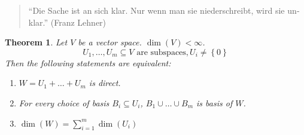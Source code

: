 \documentclass[a4paper,landscape,twocolumn]{article}
\newcommand\set[1]{\left\{#1\right\}}
\newtheorem{theorem}{Theorem}[section]
\begin{document}
\begin{quote}
  \foreignlanguage{ngerman}{\enquote{Die Sache ist an sich klar. Nur wenn man sie niederschreibt, wird sie unklar.} (Franz Lehner)}
\end{quote}

\begin{theorem}
  \label{satz-4-15}
  Let $V$ be a vector space. $\dim(V) < \infty$.
  \[ U_1, \dots, U_m \subseteq V \text{ are subspaces}, U_i \neq \set{0} \]
  Then the following statements are equivalent:
  \begin{enumerate}
    \item $W = U_1 + \dots + U_m$ is direct.
    \item For every choice of basis $B_i \subseteq U_i$, $B_1 \cup \dots \cup B_m$ is basis of $W$.
    \item $\dim(W) = \sum_{i=1}^m \dim(U_i)$
  \end{enumerate}
\end{theorem}
\end{document}
